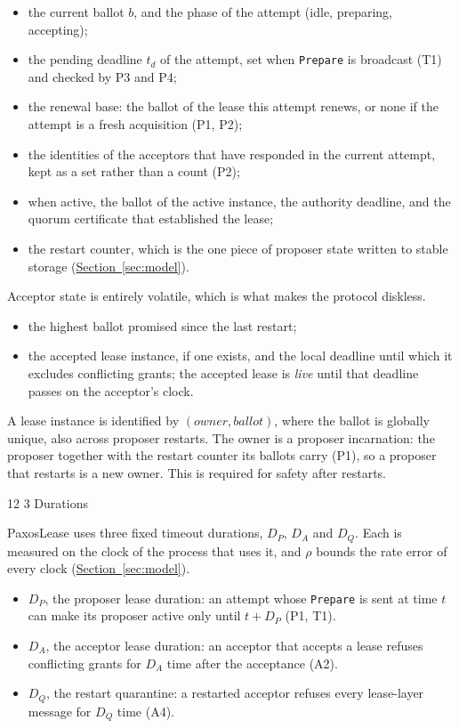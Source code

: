 \documentclass[final,5p,times,twocolumn,number]{elsarticle}
\makeatletter
\newcommand{\code}[1]{\texttt{#1}}
\newcommand{\secref}[1]{\hyperref[#1]{Section~\ref*{#1}}}
\renewcommand\subsection{\@startsection{subsection}{2}{\z@}%
           {12\p@ \@plus 6\p@ \@minus 3\p@}%
           {3\p@ \@plus 6\p@ \@minus 3\p@}%
           {\normalfont\normalsize\bfseries}}
\makeatother
\begin{document}
\begin{itemize}\itemsep0.25em
\item the current ballot $b$, and the phase of the attempt (idle, preparing, accepting);
\item the pending deadline $t_d$ of the attempt, set when \code{Prepare} is broadcast (T1) and checked by P3 and P4;
\item the renewal base: the ballot of the lease this attempt renews, or none if the attempt is a fresh acquisition (P1, P2);
\item the identities of the acceptors that have responded in the current attempt, kept as a set rather than a count (P2);
\item when active, the ballot of the active instance, the authority deadline, and the quorum certificate that established the lease;
\item the restart counter, which is the one piece of proposer state written to stable storage (\secref{sec:model}).
\end{itemize}

Acceptor state is entirely volatile, which is what makes the protocol diskless.

\begin{itemize}\itemsep0.25em
\item the highest ballot promised since the last restart;
\item the accepted lease instance, if one exists, and the local deadline until which it excludes conflicting grants; the accepted lease is \emph{live} until that deadline passes on the acceptor's clock.
\end{itemize}

A lease instance is identified by $(owner, ballot)$, where the ballot is globally unique, also across proposer restarts.  The owner is a proposer incarnation: the proposer together with the restart counter its ballots carry (P1), so a proposer that restarts is a new owner.  This is required for safety after restarts.

\subsection{Durations}\label{sec:durations}

PaxosLease uses three fixed timeout durations, $D_P$, $D_A$ and $D_Q$.  Each is measured on the clock of the process that uses it, and $\rho$ bounds the rate error of every clock (\secref{sec:model}).

\begin{itemize}\itemsep0.25em
\item $D_P$, the proposer lease duration: an attempt whose \code{Prepare} is sent at time $t$ can make its proposer active only until $t + D_P$ (P1, T1).
\item $D_A$, the acceptor lease duration: an acceptor that accepts a lease refuses conflicting grants for $D_A$ time after the acceptance (A2).
\item $D_Q$, the restart quarantine: a restarted acceptor refuses every lease-layer message for $D_Q$ time (A4).
\end{itemize}
\end{document}
